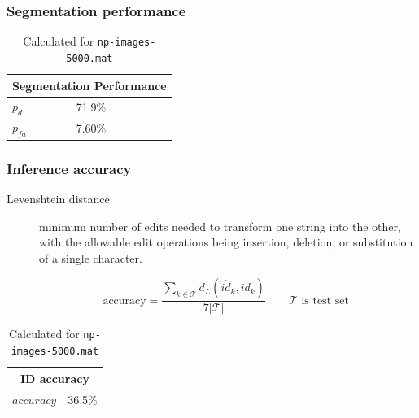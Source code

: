 \documentclass{beamer}
\newcommand{\test}{\ensuremath{\mathcal{T}}}
\begin{document}
\begin{frame}
  \frametitle{Segmentation performance}
  \begin{table}[ht]
    \begin{center}
      \begin{tabular}{|l|l|}
        \hline
        \multicolumn{2}{|c|}{Segmentation Performance} \\
        \hline
        $p_d$ & 71.9\% \\
        $p_{fa}$ & 7.60\% \\
        \hline
      \end{tabular}
      \caption{Calculated for \texttt{np-images-5000.mat}}
      \label{table:segmentation}
    \end{center}
  \end{table}
\end{frame}

\begin{frame}
\frametitle{Inference accuracy}
\begin{description}
\item[Levenshtein distance] minimum number of edits needed to transform one string into the
other, with the allowable edit operations being insertion, deletion,
or substitution of a single character.

\[ \text{accuracy} = \frac{\sum_{k \in \test}
  d_L(\hat{id}_k,id_k)}{7|\test|} \qquad \test \text{ is test set }  \]
\end{description}

\begin{table}[ht]
\begin{center}
\begin{tabular}{|l|l|}
  \hline
  \multicolumn{2}{|c|}{ID accuracy} \\
  \hline
  $accuracy$ & 36.5\% \\
  \hline
\end{tabular}
\caption{Calculated for \texttt{np-images-5000.mat}}
\end{center}
\end{table} 
  
\end{frame}
\end{document}
